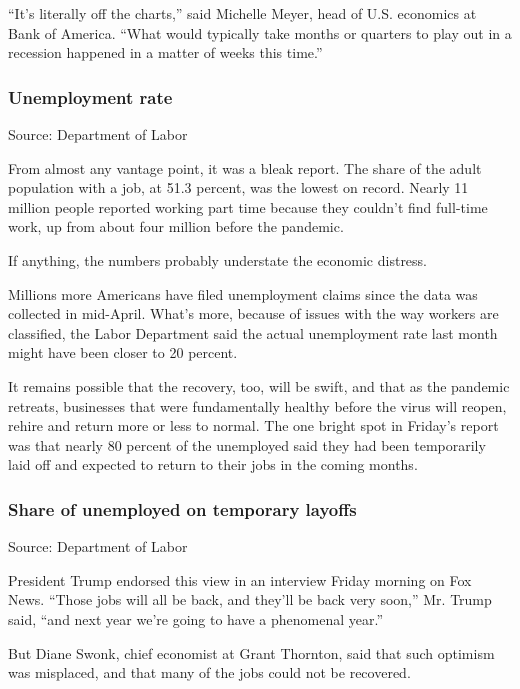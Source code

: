 ``It's literally off the charts,'' said Michelle Meyer, head of U.S.
economics at Bank of America. ``What would typically take months or
quarters to play out in a recession happened in a matter of weeks this
time.''

\hypertarget{unemployment-rate}{%
\subsubsection{Unemployment rate}\label{unemployment-rate}}

Source: Department of Labor

From almost any vantage point, it was a bleak report. The share of the
adult population with a job, at 51.3 percent, was the lowest on record.
Nearly 11 million people reported working part time because they
couldn't find full-time work, up from about four million before the
pandemic.

If anything, the numbers probably understate the economic distress.

Millions more Americans have filed unemployment claims since the data
was collected in mid-April. What's more, because of issues with the way
workers are classified, the Labor Department said the actual
unemployment rate last month might have been closer to 20 percent.

It remains possible that the recovery, too, will be swift, and that as
the pandemic retreats, businesses that were fundamentally healthy before
the virus will reopen, rehire and return more or less to normal. The one
bright spot in Friday's report was that nearly 80 percent of the
unemployed said they had been temporarily laid off and expected to
return to their jobs in the coming months.

\hypertarget{share-of-unemployed-on-temporary-layoffs}{%
\subsubsection{Share of unemployed on temporary
layoffs}\label{share-of-unemployed-on-temporary-layoffs}}

Source: Department of Labor

President Trump endorsed this view in an interview Friday morning on Fox
News. ``Those jobs will all be back, and they'll be back very soon,''
Mr. Trump said, ``and next year we're going to have a phenomenal year.''

But Diane Swonk, chief economist at Grant Thornton, said that such
optimism was misplaced, and that many of the jobs could not be
recovered.

